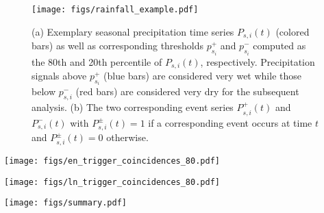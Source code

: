 \documentclass[utf8]{frontiersSCNS} %
\begin{document}
\newpage

\begin{figure}[h!]
  \centering
  \texttt{[image: figs/rainfall\_example.pdf]}
  \caption{(a) Exemplary seasonal precipitation time series $P_{s,i}(t)$ (colored bars) as well as corresponding thresholds $p^+_{s_i}$ and $p^-_{s_i}$ computed as the 80th and 20th percentile of $P_{s,i}(t)$, respectively. Precipitation signals above $p^+_{s_i}$ (blue bars) are considered very wet while those below $p^-_{s,i}$ (red bars) are considered very dry for the subsequent analysis. (b) The two corresponding event series $P^+_{s,i}(t)$ and $P^-_{s,i}(t)$ with $P^\pm_{s,i}(t)=1$ if a corresponding event occurs at time $t$ and $P^\pm_{s,i}(t)=0$ otherwise.}
 \label{fig:rainfall_example}
\end{figure}

\begin{figure*}[h!]
  \centering
  \texttt{[image: figs/en\_trigger\_coincidences\_80.pdf]}
  \caption{Statistically significant event coincidence rates (ECR) between EP (left column) and CP (right column) El Ni\~nos and very dry (red squares) or very wet (blue squares) conditions for the three seasons SON, DJF, and MAM. Dry/wet periods are defined by seasonal precipitation sums below/above the 20th/80th percentile of all years from 1951 to 2016. Only significant clusters of at least two adjacent grid-cells are shown. Different shades of red/blue indicate increasing magnitudes of significant ECR between the respective El Ni\~no events and strong/weak seasonal precipitation. Yellow areas indicate grid cells with non-significant event coincidence rates. White areas over land indicate insufficient quality of the GPCC dataset (i.e., grid cells excluded from our analysis).}
  \label{fig:eca_el_nino}
\end{figure*}

\begin{figure*}[ht!]
  \centering
  \texttt{[image: figs/ln\_trigger\_coincidences\_80.pdf]}
  \caption{Same as Fig.~\ref{fig:eca_el_nino}, but for the two types of La Ni\~na.
  }\label{fig:eca_la_nina}
\end{figure*}

\begin{figure*}[t]
  \centering
  \texttt{[image: figs/summary.pdf]}
  \caption{Schematic summary of the results presented in this work. Shaded areas indicate
    major regions in which very high or low seasonal precipitation
    sums show significant event coincidence rates with EP (a,c) or CP (b,d) El
    Ni\~no (a,b) or La Ni\~na phases (c,d). 
    }\label{fig:summary}
\end{figure*}
\end{document}
